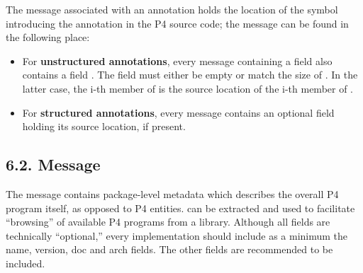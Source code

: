 \documentclass[11pt]{article}
\begin{document}
{%
The  message associated with an annotation holds the location of
the  symbol introducing the annotation in the P4 source code; the message can
be found in the following place:%

\begin{itemize}%

\item{}
For \textbf{unstructured annotations}, every message containing a field
 also contains a field
. The field must either be empty
 or match the size of . In the latter case, the i-th member of
 is the source location of the i-th member of
.%

\item{}
For \textbf{structured annotations}, every  message contains
an optional field  holding its source
location, if present.%
\end{itemize}%

\subsection{6.2.\hspace*{0.5em} Message}\label{sec-pkginfo-message}%

\noindent{}The  message contains package-level metadata which describes the
overall P4 program itself, as opposed to P4 entities.  can be extracted
and used to facilitate \textquotedblleft{}browsing\textquotedblright{} of available P4 programs from a
library. Although all fields are technically \textquotedblleft{}optional,\textquotedblright{} every implementation
should include as a minimum the name, version, doc and arch fields. The other
fields are recommended to be included.%

}
\end{document}
